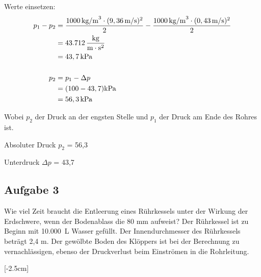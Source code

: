\documentclass[a4paper,11pt]{article}
\newif\ifshowme
\begin{document}
\begin{marginfigure}[+2cm]
{\pp



Werte einsetzen: 
\begin{align*}
p_1 - p_2 &= \frac{1000 \mskip3mu \text{kg/m}^3 \cdot (9,36\mskip3mu \text{m/s} )^2}{2} -  \frac{1000 \mskip3mu \text{kg/m}^3 \cdot (0,43 \mskip3mu \text{m/s} )^2}{2} \\
&= 43.712 \mskip3mu \frac{\text{kg}}{\text{m} \cdot \text{s}^2} \\
&= 43,7 \mskip3mu \text{kPa} \\ \\
p_2 &= p_1 - \Delta p \\
	&= (100 - 43,7)\text{kPa}\\ &= 56,3\mskip3mu \text{kPa}
\end{align*}

Wobei $p_2$ der Druck an der engsten Stelle und $p_1$ der Druck am Ende des Rohres ist.\par
Absoluter Druck $p_2$ = 56,3  \par 
Unterdruck $\Delta p$ = 43,7  \par 
}
\pagebreak
\else
\fi


\subsection*{Aufgabe 3}
Wie viel Zeit braucht die Entleerung eines Rührkessels unter der Wirkung der \mbox{Erdschwere}, wenn der Bodenablass die  80 mm aufweist? Der Rührkessel ist zu Beginn mit \mbox{10.000 L} Wasser gefüllt. Der Innendurchmesser des Rührkessels beträgt 2,4 m. Der gewölbte Boden des Klöppers ist bei der Berechnung zu vernachlässigen, ebenso der Druckverlust beim Einströmen in die Rohrleitung.




[-2.5cm]

\ifshowme
{}
\end{marginfigure}
\end{document}
